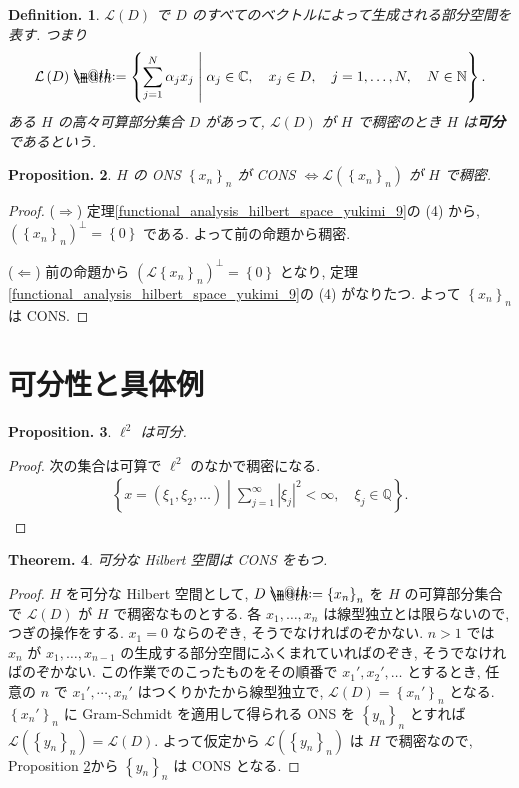 \documentclass[openany, a4paper, oneside]{jsbook}
\makeatletter
\newcommand*{\defeq}{\mathrel{\rlap{%
\raisebox{0.3ex}{$\m@th\cdot$}}%
\raisebox{-0.3ex}{$\m@th\cdot$}}%
=}
\theoremstyle{break}
\theoremstyle{breakdefn}
\newtheorem{thm}{Theorem.}[section]
\newtheorem{prop}[thm]{Proposition.}
\newtheorem{defn}[thm]{Definition.}
\newcommand{\abs}[1]{\left|#1\right|}
\newcommand{\rbk}[1]{\left (#1\right)}
\newcommand{\cbk}[1]{\left\{#1\right\}}
\newcommand{\relmiddle}[1]{\mathrel{}\middle#1\mathrel{}}
\newcommand{\set}[2]{\left\{#1 \relmiddle| #2\right\}}
\newcommand{\bbC}{\mathbb{C}}
\newcommand{\bbN}{\mathbb{N}}
\newcommand{\bbQ}{\mathbb{Q}}
\newcommand{\calL}{\mathcal{L}}
\newcommand{\upbf}[1]{\textup{\textbf{#1}}}
\makeatother
\begin{document}
\begin{defn}
 $\mathcal{L}(D)$ で $D$ のすべてのベクトルによって生成される部分空間を表す.
 つまり
 \begin{align}
  \calL \rbk{D}
  \defeq
  \set{\sum_{j=1}^N \alpha_j x_j}{\alpha_j \in \bbC, \quad x_j \in D, \quad j = 1, \dots, N, \quad N \in \bbN}.
 \end{align}
 ある $H$ の高々可算部分集合 $D$ があって, $\calL (D)$ が $H$ で稠密のとき $H$ は\upbf{可分}であるという.
\end{defn}

\begin{prop}\label{functional_analysis_hilbert_space_yukimi_10}
 $H$ の ONS $\cbk{x_n}_n$ が CONS $\Longleftrightarrow \calL(\cbk{x_n}_n)$ が $H$ で稠密.
\end{prop}
\begin{proof}
($\Longrightarrow$)
定理\ref{functional_analysis_hilbert_space_yukimi_9}の (4) から,
$(\cbk{x_n}_n)^\perp = \cbk{0}$ である.
よって前の命題から稠密.

($\Longleftarrow$)
前の命題から $(\calL \cbk{x_n}_n)^\perp = \cbk{0}$ となり,
定理 \ref{functional_analysis_hilbert_space_yukimi_9}の (4) がなりたつ.
よって $\cbk{x_n}_n$ は CONS.
\end{proof}
\section{可分性と具体例}


\begin{prop}
 $\ell^2$ は可分.
\end{prop}
\begin{proof}
次の集合は可算で $\ell^2$ のなかで稠密になる.
\begin{align}
 \set{x = \rbk{\xi_1, \xi_2, \dots}}{\sum_{j=1}^{\infty} \abs{\xi_j}^2 < \infty, \quad \xi_j \in \bbQ}.
\end{align}
\end{proof}

\begin{thm}
 可分な Hilbert 空間は CONS をもつ.
\end{thm}
\begin{proof}
$H$ を可分な Hilbert 空間として, $D \defeq \cbk{x_n}_n$ を $H$ の可算部分集合で
$\calL (D)$ が $H$ で稠密なものとする.
各 $x_1, \dots, x_n$ は線型独立とは限らないので, つぎの操作をする.
$x_1 = 0$ ならのぞき, そうでなければのぞかない.
$n > 1$ では $x_n$ が $x_1, \dots, x_{n-1}$ の生成する部分空間にふくまれていればのぞき, そうでなければのぞかない.
この作業でのこったものをその順番で $x_{1}', x_{2}', \dots$ とするとき,
任意の $n$ で $x_{1}', \cdots, x_{n}'$ はつくりかたから線型独立で,
$\calL(D) = \cbk{x_{n}'}_{n}$ となる.
$\cbk{x_n'}_n$ に Gram-Schmidt を適用して得られる ONS を $\cbk{y_n}_n$ とすれば
$\calL(\cbk{y_n}_n) = \calL (D)$.
よって仮定から $\calL (\cbk{y_n}_n)$ は $H$ で稠密なので,
Proposition \ref{functional_analysis_hilbert_space_yukimi_10}から $\cbk{y_n}_n$ は CONS となる.
\end{proof}
\end{document}
